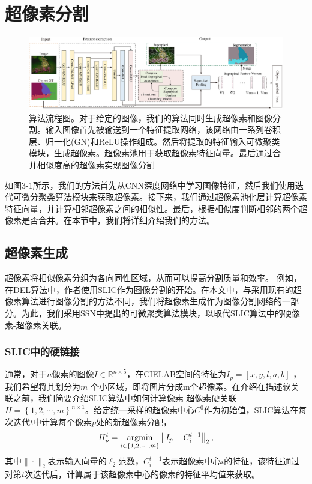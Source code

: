 
\chapter{超像素分割}

\begin{figure}[h]
\begin{center}
\includegraphics[width=1\textwidth]{figures/img/pipeline.pdf}
\end{center}
\vspace{-5mm}
\caption{算法流程图。对于给定的图像，我们的算法同时生成超像素和图像分割。输入图像首先被输送到一个特征提取网络，该网络由一系列卷积层、归一化(GN)和ReLU操作组成。然后将提取的特征输入可微聚类模块，生成超像素。超像素池用于获取超像素特征向量。最后通过合并相似度高的超像素实现图像分割}
\label{Fig.sub.1}
\end{figure}

如图3-1所示，我们的方法首先从CNN深度网络中学习图像特征，然后我们使用迭代可微分聚类算法模块来获取超像素。接下来，我们通过超像素池化层计算超像素特征向量，并计算相邻超像素之间的相似性。最后，根据相似度判断相邻的两个超像素是否合并。在本节中，我们将详细介绍我们的方法。

\section{超像素生成}

超像素将相似像素分组为各向同性区域，从而可以提高分割质量和效率。 例如，在DEL算法中，作者使用SLIC作为图像分割的开始。在本文中，与采用现有的超像素算法进行图像分割的方法不同，我们将超像素生成作为图像分割网络的一部分。为此，我们采用SSN中提出的可微聚类算法模块，以取代SLIC算法中的硬像素-超像素关联。

\subsection{SLIC中的硬链接}
通常，对于$n$像素的图像\(I\in\mathbb{R}^{n\times 5}\)，在CIELAB空间的特征为$I_p=[x,y,l,a,b]$ ，我们希望将其划分为$m$ 个小区域，即将图片分成m个超像素。在介绍在描述软关联之前，我们简要介绍SLIC算法中如何计算像素-超像素硬关联$H = \left \{1, 2, \cdots, m \right \}^{n\times 1}$。给定统一采样的超像素中心$C^{0}$作为初始值，SLIC算法在每次迭代$t$中计算每个像素$p$处的新超像素分配，
\begin{equation}\label{eqn:hardassn}
H_{p}^{t} =  \mathop{{{\rm argmin}}}\limits_{{i\in\{ 1, 2, \cdots ,m \} }}\left\|I_{p}-C_{i}^{t-1}\right\|_2,
\end{equation}
其中$\|\cdot\|_2$表示输入向量的$\ell_2$范数，$C_i^{t-1}$表示超像素中心$i$的特征，该特征通过对第$t$次迭代后，计算属于该超像素中心的像素的特征平均值来获取。

